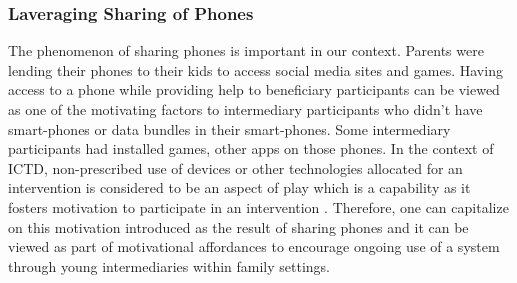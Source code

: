 \documentclass{sig-alternate}
\begin{document}
\subsubsection*{\textbf{Laveraging Sharing of Phones}}
The phenomenon of sharing phones is important in our context. Parents were lending their phones to their kids to access social media sites and games. Having access to a phone while providing help to beneficiary participants can be viewed as one of the motivating factors to intermediary participants who didn't have smart-phones or data bundles in their smart-phones. Some intermediary participants had installed games, other apps on those phones. In the context of ICTD, non-prescribed use of devices or other technologies allocated for an intervention is considered to be an aspect of play which is a capability as it fosters motivation to participate in an intervention \cite{ferr2015:play}. Therefore, one can capitalize on this motivation introduced as the result of sharing phones and it can be viewed as part of motivational affordances to encourage ongoing use of a system through young intermediaries within family settings.
\end{document}
